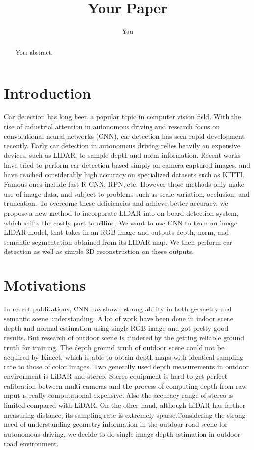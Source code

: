\documentclass[a4paper]{article}
\title{Your Paper}
\author{You}
\begin{document}
\maketitle

\begin{abstract}
Your abstract.
\end{abstract}

\section{Introduction}
Car detection has long been a popular topic in computer vision field. With the rise of industrial attention in autonomous driving and research focus on convolutional neural networks (CNN), car detection has seen rapid development recently. Early car detection in autonomous driving relies heavily on expensive devices, such as LIDAR, to sample depth and norm information. Recent works have tried to perform car detection based simply on camera captured images, and have reached considerably high accuracy on specialized datasets such as KITTI. Famous ones include fast R-CNN\cite{}, RPN\cite{}, etc. However those methods only make use of image data, and subject to problems such as scale variation, occlusion, and truncation\cite{}. To overcome these deficiencies and achieve better accuracy, we propose a new method to incorporate LIDAR into on-board detection system, which shifts the costly part to offline. We want to use CNN to train an image-LIDAR model, that takes in an RGB image and outputs depth, norm, and semantic segmentation obtained from its LIDAR map. We then perform car detection as well as simple 3D reconstruction on these outputs.

\section{Motivations}
In recent publications, CNN has shown strong ability in both geometry and semantic scene understanding. A lot of work have been done in indoor scene depth and normal estimation using single RGB image and got pretty good results\cite{laina2016deeper}\cite{li2015depth}\cite{hane2015direction}\cite{eigen2015predicting}. But research of outdoor scene is hindered by the getting reliable ground truth for training. The depth ground truth of outdoor scene could not be acquired by Kinect, which is able to obtain depth maps with identical sampling rate to those of color images. Two generally used depth measurements in outdoor environment is LiDAR and stereo. Stereo equipment is hard to get perfect calibration between multi cameras and the process of computing depth from raw input is really computational expensive. Also the accuracy range of stereo is limited compared with LiDAR. On the other hand, although LiDAR has farther measuring distance, its sampling rate is extremely sparse.Considering the strong need of understanding geometry information in the outdoor road scene for autonomous driving, we decide to do single image depth estimation in outdoor road environment. 
\end{document}
